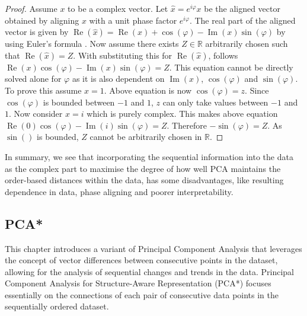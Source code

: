 \documentclass[pdftex,12pt,a4paper]{report}
\begin{document}
\begin{proof}
    Assume $x$ to be a complex vector.
    Let $\hat{x} = e^{i \varphi}x$ be the aligned vector obtained by aligning $x$ with a unit phase factor $e^{i \varphi}$.
    The real part of the aligned vector is given by $\operatorname{Re}(\hat{x}) = \operatorname{Re}(x) + \cos(\varphi) - \operatorname{Im}(x) \sin(\varphi)$ by using Euler's formula .
    Now assume there exists $Z \in \mathbb{R}$ arbitrarily chosen such that $\operatorname{Re}(\hat{x}) = Z$.
    With substituting this for $\operatorname{Re}(\hat{x})$, follows $\operatorname{Re}(x) \cos(\varphi) - \operatorname{Im}(x) \sin(\varphi) = Z$.
    This equation cannot be directly solved alone for $\varphi$ as it is also dependent on $\operatorname{Im}(x)$, $\cos(\varphi)$ and $\sin(\varphi)$.
    To prove this assume $x = 1$.
    Above equation is now $ \cos(\varphi)= z$.
    Since $\cos(\varphi)$ is bounded between $-1$ and $1$, $z$ can only take values between $-1$ and $1$.
    Now consider $x = i$ which is purely complex.
    This makes above equation $\operatorname{Re}(0) \cos(\varphi) - \operatorname{Im}(i) \sin(\varphi) = Z$.
    Therefore $-\sin(\varphi) = Z$.
    As $\sin()$ is bounded, $Z$ cannot be arbitrarily chosen in $\mathbb{R}$.
\end{proof}

In summary, we see that incorporating the sequential information into the data as the complex part to maximise the degree of how well PCA maintains the order-based distances within the data, has some disadvantages, like resulting dependence in data, phase aligning and poorer interpretability.

\subsection{PCA*} \label{pca*-section}
This chapter introduces a variant of Principal Component Analysis that leverages the concept of vector differences between consecutive points in the dataset, allowing for the analysis of sequential changes and trends in the data.
Principal Component Analysis for Structure-Aware Representation (PCA*) focuses essentially on the connections of each pair of consecutive data points in the sequentially ordered dataset.
\end{document}
